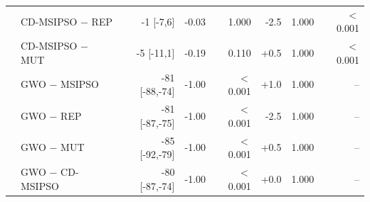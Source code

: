 \begin{tabular}{llrrrrrr}
 & CD-MSIPSO $-$ REP & -1 [-7,6] & -0.03 & 1.000 & -2.5 & 1.000 & $<$0.001\\
 & CD-MSIPSO $-$ MUT & -5 [-11,1] & -0.19 & 0.110 & +0.5 & 1.000 & $<$0.001\\
 & GWO $-$ MSIPSO & -81 [-88,-74] & -1.00 & $<$0.001 & +1.0 & 1.000 & --\\
 & GWO $-$ REP & -81 [-87,-75] & -1.00 & $<$0.001 & -2.5 & 1.000 & --\\
 & GWO $-$ MUT & -85 [-92,-79] & -1.00 & $<$0.001 & +0.5 & 1.000 & --\\
 & GWO $-$ CD-MSIPSO & -80 [-87,-74] & -1.00 & $<$0.001 & +0.0 & 1.000 & --\\
\bottomrule
\end{tabular}